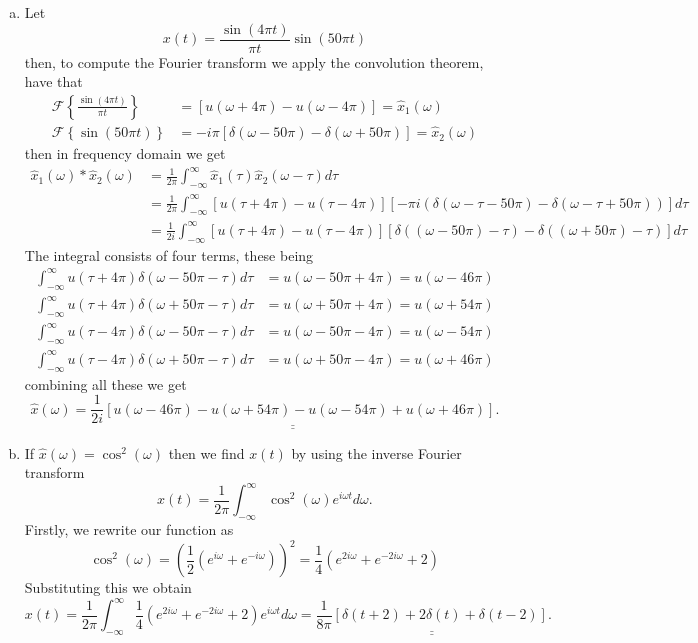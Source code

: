 \begin{enumerate}
\begin{enumerate}[a)]
\item Let
$$x(t)=\frac{\sin(4\pi t)}{\pi t}\sin(50\pi t)$$
then, to compute the Fourier transform we apply the convolution theorem, have that
\begin{align*}
    \mathcal{F}\left\{\frac{\sin(4\pi t)}{\pi t}\right\}&=[u(\omega+4\pi)-u(\omega-4\pi)]=\hat{x}_{1}(\omega) \\
    \mathcal{F}\left\{\sin(50\pi t)\right\}&=-i\pi[\delta(\omega-50\pi)-\delta(\omega+50\pi)]=\hat{x}_{2}(\omega)
\end{align*}
then in frequency domain we get
\begin{align*}
\hat{x}_{1}(\omega)*\hat{x}_{2}(\omega)&=\frac{1}{2\pi}\int_{-\infty}^{\infty}\hat{x}_{1}(\tau)\hat{x}_{2}(\omega-\tau)d\tau \\
&=\frac{1}{2\pi}\int_{-\infty}^{\infty}[u(\tau+4\pi)-u(\tau-4\pi)][-\pi i(\delta(\omega-\tau-50\pi)-\delta(\omega-\tau+50\pi))]d\tau \\
&=\frac{1}{2i}\int_{-\infty}^{\infty}[u(\tau+4\pi)-u(\tau-4\pi)][\delta((\omega-50\pi)-\tau)-\delta((\omega+50\pi)-\tau)]d\tau
\end{align*}
The integral consists of four terms, these being
\begin{align*}
    \int_{-\infty}^{\infty}u(\tau+4\pi)\delta(\omega-50\pi-\tau)d\tau&=u(\omega-50\pi+4\pi)=u(\omega-46\pi) \\
    \int_{-\infty}^{\infty}u(\tau+4\pi)\delta(\omega+50\pi-\tau)d\tau&=u(\omega+50\pi+4\pi)=u(\omega+54\pi) \\
    \int_{-\infty}^{\infty}u(\tau-4\pi)\delta(\omega-50\pi-\tau)d\tau&=u(\omega-50\pi-4\pi)=u(\omega-54\pi) \\
    \int_{-\infty}^{\infty}u(\tau-4\pi)\delta(\omega+50\pi-\tau)d\tau&=u(\omega+50\pi-4\pi)=u(\omega+46\pi)
\end{align*}
combining all these we get
$$\hat{x}(\omega)=\underline{\underline{\frac{1}{2i}[u(\omega-46\pi)-u(\omega+54\pi)-u(\omega-54\pi)+u(\omega+46\pi)]}}.$$

\item If $\hat{x}(\omega)=\cos^{2}(\omega)$ then we find $x(t)$ by using the inverse Fourier transform
$$x(t)=\frac{1}{2\pi}\int_{-\infty}^{\infty}\cos^{2}(\omega)e^{i\omega t}d\omega.$$
Firstly, we rewrite our function as
$$\cos^{2}(\omega)=\left(\frac{1}{2}\left(e^{i\omega}+e^{-i\omega}\right)\right)^{2}=\frac{1}{4}\left(e^{2i\omega }+e^{-2i\omega}+2\right)$$
Substituting this we obtain
$$x(t)=\frac{1}{2\pi}\int_{-\infty}^{\infty}\frac{1}{4}\left(e^{2i\omega }+e^{-2i\omega}+2\right)e^{i\omega t}d\omega=\underline{\underline{\frac{1}{8\pi}[\delta(t+2)+2\delta(t)+\delta(t-2)]}}.$$
\end{enumerate}


\end{enumerate}
